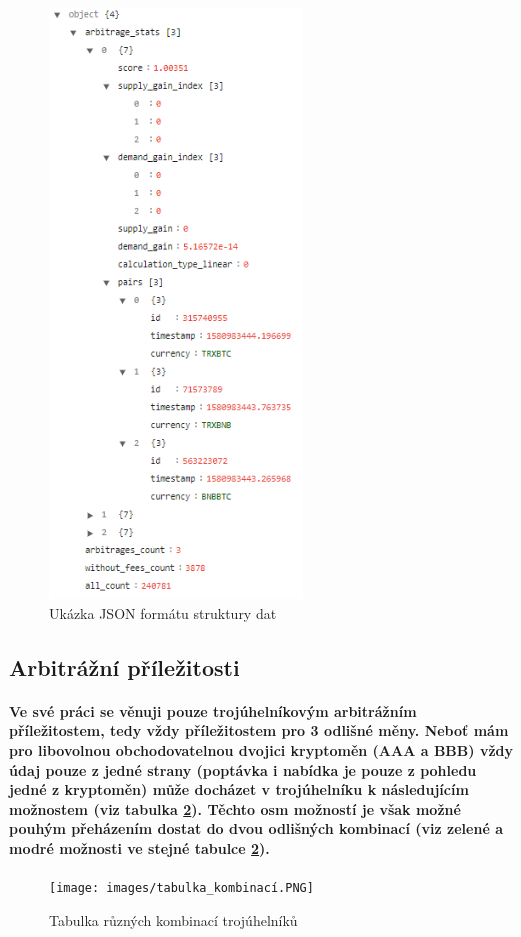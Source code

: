 \documentclass[thesis=B,czech]{FITthesis}[2019/03/21]
\begin{document}
\begin{figure}\centering
	\includegraphics[width=0.6\textwidth]{images/json_data.PNG}
	\caption{Ukázka JSON formátu struktury dat}\label{json_data}
\end{figure}
\subsection{Arbitrážní příležitosti}
\paragraph{
Ve své práci se věnuji pouze trojúhelníkovým arbitrážním příležitostem, tedy vždy příležitostem pro 3 odlišné měny. Neboť mám pro libovolnou obchodovatelnou dvojici kryptoměn (AAA a BBB) vždy údaj pouze z jedné strany (poptávka i nabídka je pouze z pohledu jedné z kryptoměn) může docházet v trojúhelníku k následujícím možnostem (viz tabulka \ref{tabulka_kombinaci}). Těchto osm možností je však možné pouhým přeházením dostat do dvou odlišných kombinací (viz zelené a modré možnosti ve stejné tabulce \ref{tabulka_kombinaci}).
}
\begin{figure}\centering
	\texttt{[image: images/tabulka\_kombinací.PNG]}
	\caption{Tabulka různých kombinací trojúhelníků}\label{tabulka_kombinaci}
\end{figure}
\end{document}
